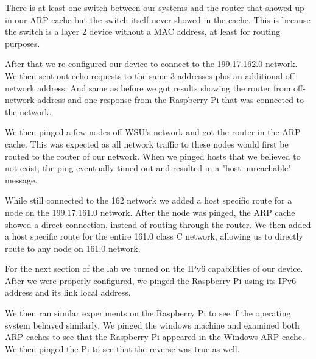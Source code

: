 \documentclass[prb,preprint]{revtex4-1}
\begin{document}
There is at least one switch between our systems and the router that showed up in our ARP cache but the switch itself never showed in the cache. This is because the switch is a layer 2 device without a MAC address, at least for routing purposes.
\newline

After that we re-configured our device to connect to the 199.17.162.0 network. We then sent out echo requests to the same 3 addresses plus an additional off-network address. And same as before we got results showing the router from off-network address and one response from the Raspberry Pi that was connected to the network. 
\newline

We then pinged a few nodes off WSU’s network and got the router in the ARP cache. This was expected as all network traffic to these nodes would first be routed to the router of our network. When we pinged hosts that we believed to not exist, the ping eventually timed out and resulted in a "host unreachable" message.
\newline

While still connected to the 162 network we added a host specific route for a node on the 199.17.161.0 network. After the node was pinged, the ARP cache showed a direct connection, instead of routing through the router. We then added a host specific route for the entire 161.0 class C network, allowing us to directly route to any node on 161.0 network.
\newline

For the next section of the lab we turned on the IPv6 capabilities of our device. After we were properly configured, we pinged the Raspberry Pi using its IPv6 address and its link local address.
\newline

We then ran similar experiments on the Raspberry Pi to see if the operating system behaved similarly. We pinged the windows machine and examined both ARP caches to see that the Raspberry Pi appeared in the Windows ARP cache. We then pinged the Pi to see that the reverse was true as well. 

\newpage
\end{document}
